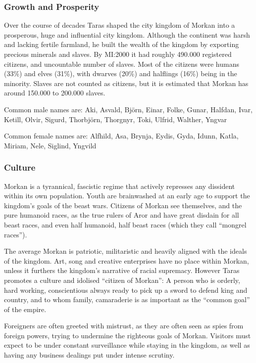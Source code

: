 \subsubsection{Growth and Prosperity}

Over the course of decades Taras shaped the city kingdom of Morkan into a
prosperous, huge and influential city kingdom. Although the continent was
harsh and lacking fertile farmland, he built the wealth of the kingdom by
exporting precious minerals and slaves. By MI:2000 it had roughly 490.000
registered citizens, and uncountable number of slaves. Most of the citizens
were humans (33\%) and elves (31\%), with dwarves (20\%) and halflings (16\%)
being in the minority. Slaves are not counted as citizens, but it is estimated
that Morkan has around 150.000 to 200.000 slaves.

Common male names are: Aki, Asvald, Björn, Einar, Folke, Gunar, Halfdan, Ivar,
Ketill, Olvir, Sigurd, Thorbjörn, Thorgnyr, Toki, Ulfrid, Walther, Yngvar

Common female names are: Alfhild, Asa, Brynja, Eydis, Gyda, Idunn, Katla,
Miriam, Nele, Siglind, Yngvild

\subsubsection{Culture}

Morkan is a tyrannical, fascistic regime that actively represses any dissident
within its own population. Youth are brainwashed at an early age to support
the kingdom's goals of the beast wars. Citizens of Morkan see themselves, and
the pure humanoid races, as the true rulers of Aror and have great disdain for
all beast races, and even half humanoid, half beast races (which they call
``mongrel races'').

The average Morkan is patriotic, militaristic and heavily aligned with the
ideals of the kingdom. Art, song and creative enterprises have no place within
Morkan, unless it furthers the kingdom's narrative of racial supremacy. However
Taras promotes a culture and idolised ``citizen of Morkan'': A person who is
orderly, hard working, conscientious always ready to pick up a sword to defend
king and country, and to whom family, camaraderie is as important as the
``common goal'' of the empire.

Foreigners are often greeted with mistrust, as they are often seen as spies
from foreign powers, trying to undermine the righteous goals of Morkan.
Visitors must expect to be under constant surveillance while staying in the
kingdom, as well as having any business dealings put under intense scrutiny.

